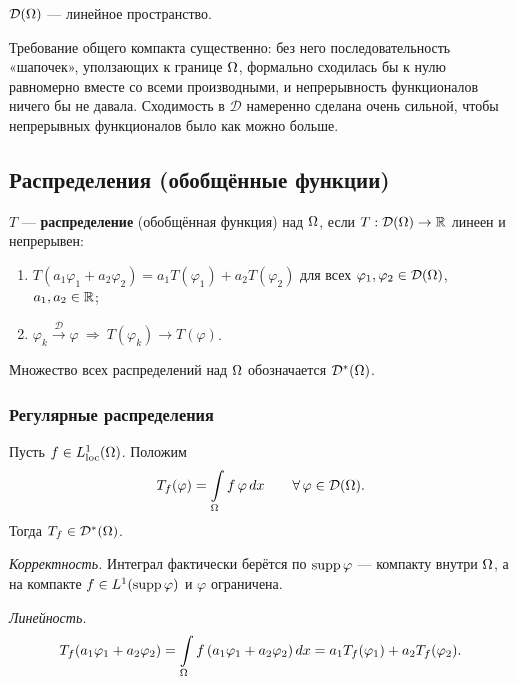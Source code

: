 
$\mathcal{D}(\Omega)$ — линейное пространство.

\begin{idea}
Требование общего компакта существенно: без него последовательность «шапочек»,
уползающих к границе $\Omega$, формально сходилась бы к нулю равномерно вместе со всеми
производными, и непрерывность функционалов ничего бы не давала. Сходимость в
$\mathcal{D}$ намеренно сделана очень сильной, чтобы непрерывных функционалов было
как можно больше.
\end{idea}

\subsection{Распределения (обобщённые функции)}

\begin{definition}
$T$ — \textbf{распределение} (обобщённая функция) над $\Omega$, если $T : \mathcal{D}(\Omega) \to \mathbb{R}$
линеен и непрерывен:
\begin{enumerate}
  \item $T(a_1\varphi_1 + a_2\varphi_2) = a_1 T(\varphi_1) + a_2 T(\varphi_2)$
        для всех $\varphi_1, \varphi_2 \in \mathcal{D}(\Omega)$, $a_1, a_2 \in \mathbb{R}$;
  \item $\varphi_k \xrightarrow{\ \mathcal{D}\ } \varphi
        \ \Longrightarrow\ T(\varphi_k) \to T(\varphi)$.
\end{enumerate}
Множество всех распределений над $\Omega$ обозначается $\mathcal{D}^*(\Omega)$.
\end{definition}

\subsubsection*{Регулярные распределения}

\begin{example}\label{ex:regular}
Пусть $f \in L^1_{\mathrm{loc}}(\Omega)$. Положим
\[
  T_f(\varphi) = \int\limits_\Omega f\,\varphi\, dx
  \qquad \forall\, \varphi \in \mathcal{D}(\Omega) .
\]
Тогда $T_f \in \mathcal{D}^*(\Omega)$.
\end{example}

\emph{Корректность.} Интеграл фактически берётся по $\operatorname{supp} \varphi$ — компакту внутри
$\Omega$, а на компакте $f \in L^{1}(\operatorname{supp}\varphi)$ и $\varphi$ ограничена.

\emph{Линейность.}
\[
  T_f(a_1\varphi_1 + a_2\varphi_2) = \int\limits_\Omega f\,(a_1\varphi_1 + a_2\varphi_2)\, dx
  = a_1 T_f(\varphi_1) + a_2 T_f(\varphi_2) .
\]


